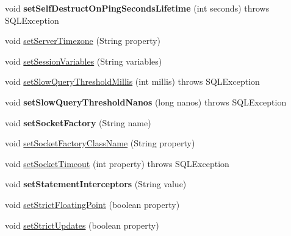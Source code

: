 \begin{DoxyCompactItemize}
void {\bfseries set\+Self\+Destruct\+On\+Ping\+Seconds\+Lifetime} (int seconds)  throws S\+Q\+L\+Exception 
\item 
void \mbox{\hyperlink{classcom_1_1mysql_1_1jdbc_1_1_multi_host_my_s_q_l_connection_a49872e46bc69088b63f84767c386e811}{set\+Server\+Timezone}} (String property)
\item 
void \mbox{\hyperlink{classcom_1_1mysql_1_1jdbc_1_1_multi_host_my_s_q_l_connection_ad1406aa3ec3a0b76716744c9be734d7f}{set\+Session\+Variables}} (String variables)
\item 
void \mbox{\hyperlink{classcom_1_1mysql_1_1jdbc_1_1_multi_host_my_s_q_l_connection_a0b2593b4f94be127319ff6d487f5edcc}{set\+Slow\+Query\+Threshold\+Millis}} (int millis)  throws S\+Q\+L\+Exception 
\item 
\mbox{\label{classcom_1_1mysql_1_1jdbc_1_1_multi_host_my_s_q_l_connection_aa8f2d9ede6c68bdc6af6176508e03beb}} 
void {\bfseries set\+Slow\+Query\+Threshold\+Nanos} (long nanos)  throws S\+Q\+L\+Exception 
\item 
\mbox{\label{classcom_1_1mysql_1_1jdbc_1_1_multi_host_my_s_q_l_connection_a232033dfd53510b0674bfb25ff782412}} 
void {\bfseries set\+Socket\+Factory} (String name)
\item 
void \mbox{\hyperlink{classcom_1_1mysql_1_1jdbc_1_1_multi_host_my_s_q_l_connection_a24d505e2b23813fa2186aae41633b5de}{set\+Socket\+Factory\+Class\+Name}} (String property)
\item 
void \mbox{\hyperlink{classcom_1_1mysql_1_1jdbc_1_1_multi_host_my_s_q_l_connection_ab71cfc835c4fb153654b63f887c41df0}{set\+Socket\+Timeout}} (int property)  throws S\+Q\+L\+Exception 
\item 
\mbox{\label{classcom_1_1mysql_1_1jdbc_1_1_multi_host_my_s_q_l_connection_aca5d1370b8518e9334b56423e8341d05}} 
void {\bfseries set\+Statement\+Interceptors} (String value)
\item 
void \mbox{\hyperlink{classcom_1_1mysql_1_1jdbc_1_1_multi_host_my_s_q_l_connection_a8953dad452ece9ae8a1f2d3cec6ca4ab}{set\+Strict\+Floating\+Point}} (boolean property)
\item 
void \mbox{\hyperlink{classcom_1_1mysql_1_1jdbc_1_1_multi_host_my_s_q_l_connection_ae687926e547ee7430e22ed60f970b1dc}{set\+Strict\+Updates}} (boolean property)

\end{DoxyCompactItemize}
